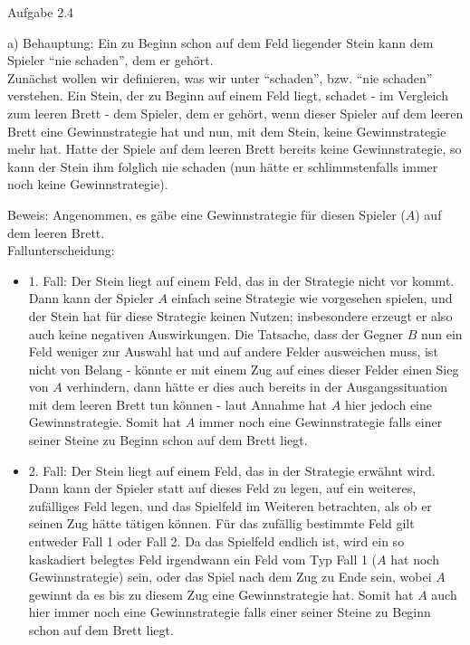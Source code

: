 \documentclass{scrartcl}
\begin{document}
\clearpage

\begin{Large}
Aufgabe 2.4\\[0.0cm]
\end{Large}

a) Behauptung: Ein zu Beginn schon auf dem Feld liegender Stein kann dem Spieler "`nie schaden"', dem er
gehört. \\

Zunächst wollen wir definieren, was wir unter "`schaden"', bzw. "`nie schaden"' verstehen. Ein Stein, der zu
Beginn auf einem Feld liegt, schadet - im Vergleich zum leeren Brett - dem Spieler, dem er gehört, wenn
dieser Spieler auf dem leeren Brett eine Gewinnstrategie hat und nun, mit dem Stein, keine Gewinnstrategie
mehr hat. Hatte der Spiele auf dem leeren Brett bereits keine Gewinnstrategie, so kann der Stein ihm
folglich nie schaden (nun hätte er schlimmstenfalls immer noch keine Gewinnstrategie).

Beweis:  Angenommen, es gäbe eine Gewinnstrategie für diesen Spieler ($A$) auf dem leeren Brett.\\

Fallunterscheidung: 
\begin{itemize}
\item{1. Fall: Der Stein liegt auf einem Feld, das in der Strategie nicht vor kommt. Dann kann der Spieler
$A$ einfach seine Strategie wie vorgesehen spielen, und der Stein hat für diese Strategie keinen Nutzen; 
insbesondere erzeugt er also auch keine negativen Auswirkungen. Die Tatsache, dass der Gegner $B$ nun ein
Feld weniger zur Auswahl hat und auf andere Felder ausweichen muss, ist nicht von Belang - könnte er mit
einem Zug auf eines dieser Felder einen Sieg von $A$ verhindern, dann hätte er dies auch bereits in der
Ausgangssituation mit dem leeren Brett tun können - laut Annahme hat $A$ hier jedoch eine
Gewinnstrategie. Somit hat $A$ immer noch eine Gewinnstrategie falls einer seiner Steine zu Beginn schon
auf dem Brett liegt.}
\item{2. Fall: Der Stein liegt auf einem Feld, das in der Strategie erwähnt wird. Dann kann der Spieler 
statt auf dieses Feld zu legen, auf ein weiteres, zufälliges Feld legen, und das Spielfeld im Weiteren
betrachten, als ob er seinen Zug hätte tätigen können. Für das zufällig bestimmte Feld gilt entweder Fall
1 oder Fall 2. Da das Spielfeld endlich ist, wird ein so kaskadiert belegtes Feld irgendwann ein Feld vom
Typ Fall 1 ($A$ hat noch Gewinnstrategie) sein, oder das Spiel nach dem Zug zu Ende sein, wobei $A$ gewinnt
da es bis zu diesem Zug eine Gewinnstrategie hat. Somit hat $A$ auch hier immer noch eine Gewinnstrategie
falls einer seiner Steine zu Beginn schon
auf dem Brett liegt.}
\end{itemize}
\end{document}

